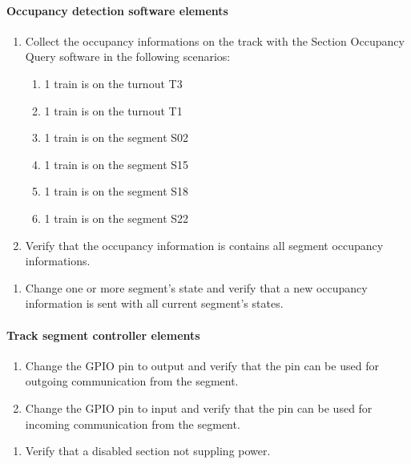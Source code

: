 \paragraph{Occupancy detection software elements}
\begin{enumerate}[label=Test-SOQ-\arabic*, leftmargin=*, format=\small]
	\item Collect the occupancy informations on the track with the Section Occupancy Query software in the following scenarios:
	\begin{enumerate}
		\item 1 train is on the turnout T3
		\item 1 train is on the turnout T1
		\item 1 train is on the segment S02
		\item 1 train is on the segment S15
		\item 1 train is on the segment S18
		\item 1 train is on the segment S22
	\end{enumerate}

	\item Verify that the occupancy information is contains all segment occupancy informations.
\end{enumerate}
\begin{enumerate}[label=TEST-OCQ-\arabic*, leftmargin=*, format=\small]
	\item Change one or more segment's state and verify that a new occupancy information is sent with all current segment's states.
\end{enumerate}

\paragraph{Track segment controller elements}
\begin{enumerate}[label=Test-GPIO-\arabic*, leftmargin=*, format=\small]
	\item Change the GPIO pin to output and verify that the pin can be used for outgoing communication from the segment.
	\item Change the GPIO pin to input and verify that the pin can be used for incoming communication from the segment.
\end{enumerate}

\begin{enumerate}[label=TEST-TEC-\arabic*, leftmargin=*, format=\small]
	\item Verify that a disabled section not suppling power.
\end{enumerate}

